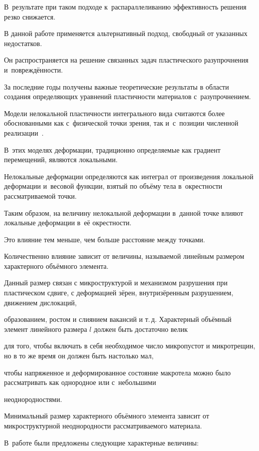 В~результате при таком подходе к~распараллеливанию эффективность решения резко снижается.



В данной работе применяется альтернативный подход, свободный от указанных недостатков. 

Он распространяется на решение связанных задач пластического разупрочнения и~повреждённости.



За последние годы получены важные теоретические результаты в области создания определяющих уравнений пластичности материалов с~разупрочнением. 

Модели нелокальной пластичности интегрального вида считаются более обоснованными как с~физической точки зрения, так и~с~позиции численной реализации~\cite{kleb11:bib5}. 

В~этих моделях деформации, традиционно определяемые как градиент перемещений, являются локальными. 

Нелокальные деформации определяются как интеграл от произведения локальной деформации и~весовой функции, взятый по объёму тела в~окрестности рассматриваемой точки. 

Таким образом, на величину нелокальной деформации в~данной точке влияют локальные деформации в~её окрестности. 

Это влияние тем меньше, чем больше расстояние между точками. 

Количественно влияние зависит от величины, называемой линейным размером характерного объёмного элемента. 

Данный размер связан с микроструктурой и механизмом разрушения при пластическом сдвиге, с деформацией зёрен, внутризёренным разрушением, движением дислокаций,

образованием, ростом и слиянием вакансий и т.\,д. Характерный объёмный элемент линейного размера $l$ должен быть достаточно велик

для того, чтобы включать в себя необходимое число микропустот и микротрещин, но в то же время он должен быть настолько мал,

чтобы напряженное и деформированное состояние макротела можно было рассматривать как однородное или с~небольшими

неоднородностями. 

Минимальный размер характерного объёмного элемента зависит от микроструктурной неоднородности рассматриваемого материала. 

В~работе \cite{kleb11:bib6} были предложены следующие характерные величины: 

